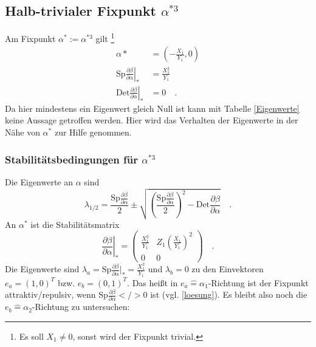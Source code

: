 \documentclass{article}
\newcommand{\Sp}{ \text{Sp} \frac{\partial \beta}{\partial \alpha}}
\newcommand{\Det}{ \text{Det} \frac{\partial \beta}{\partial \alpha}}
\begin{document}
	\subsection{Halb-trivialer Fixpunkt $\alpha^{*3}$}\label{lambda0}
		Am Fixpunkt $\alpha^*:=\alpha^{*3}$ gilt \footnote{Es soll $X_1\neq 0$, 
		sonst wird der Fixpunkt trivial.}
		\begin{align}
		\alpha*&=\left(-\frac{X_1}{Y_1},0\right) \\
		\left.\Sp \right|_* &= \frac{X_1^2}{Y_1} \\
		\left.\Det \right|_* &=0 \quad .
		\end{align}
 		Da hier mindestens ein Eigenwert gleich Null ist kann mit 
 		Tabelle \ref{Eigenwerte} keine Aussage getroffen werden. Hier wird 
 		das Verhalten der Eigenwerte in der Nähe von $\alpha^*$ zur Hilfe 
 		genommen.
 		\subsubsection{Stabilitätsbedingungen für $\alpha^{*3}$}
 		Die Eigenwerte an $\alpha$ sind
 		\begin{equation}
 		\lambda_{1/2}=\frac{\Sp}{2}\pm \sqrt{\left(\frac{\Sp}{2} \right)^2-\Det}
 		\quad .
 		\end{equation}
 		An $\alpha^*$ ist die Stabilitätsmatrix 
 		\begin{equation}
 		\left.\frac{\partial \beta}{\partial \alpha} \right|_* 
	                                       =\begin{pmatrix}
	                                         \frac{X_1^2}{Y_1} & 
	                                         Z_1\left( \frac{X_1}{Y_1}\right)^2\\
	                                         0&0
	                                        \end{pmatrix} \quad .
 		\end{equation}
 		Die Eigenwerte sind $\lambda_a=\Sp|_*=\frac{X_1^2}{Y_1}$ und 
 		$\lambda_b=0$ zu den Einvektoren 
 		$e_a=(1,0)^T$ bzw. $e_b=(0,1)^T$. Das heißt in 
 		$e_a \hat{=} \alpha_1$-Richtung ist 
 		der Fixpunkt attraktiv/repulsiv, wenn $\Sp< / > 0$ ist (vgl. 
 		\eqref{loesung}). Es bleibt also noch die $e_b\hat{=}\alpha_2$-Richtung 
 		zu untersuchen:\\
 		
\end{document}

